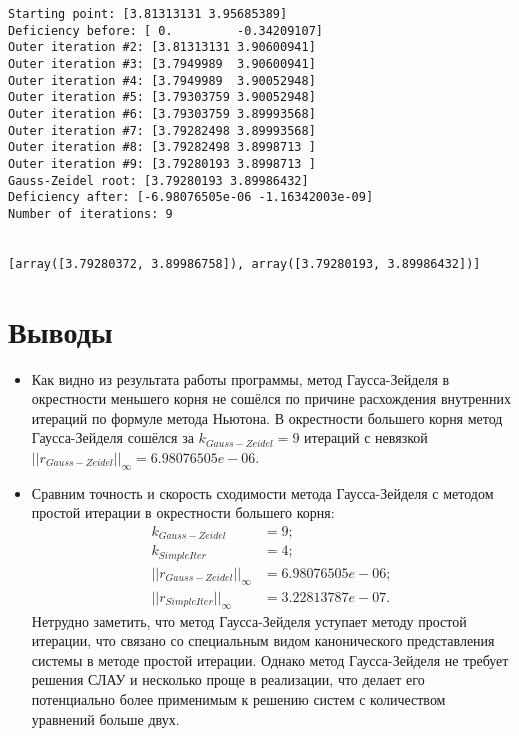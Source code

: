 \documentclass[14pt, a4paper]{article}
\begin{document}
\begin{verbatim}
Starting point: [3.81313131 3.95685389]
Deficiency before: [ 0.         -0.34209107]
Outer iteration #2: [3.81313131 3.90600941]
Outer iteration #3: [3.7949989  3.90600941]
Outer iteration #4: [3.7949989  3.90052948]
Outer iteration #5: [3.79303759 3.90052948]
Outer iteration #6: [3.79303759 3.89993568]
Outer iteration #7: [3.79282498 3.89993568]
Outer iteration #8: [3.79282498 3.8998713 ]
Outer iteration #9: [3.79280193 3.8998713 ]
Gauss-Zeidel root: [3.79280193 3.89986432]
Deficiency after: [-6.98076505e-06 -1.16342003e-09]
Number of iterations: 9


[array([3.79280372, 3.89986758]), array([3.79280193, 3.89986432])]
\end{verbatim}

  \section{Выводы}
  \begin{itemize}
  \item
  Как видно из результата работы программы, метод Гаусса-Зейделя в окрестности меньшего корня не сошёлся по причине расхождения внутренних итераций по формуле метода Ньютона. В окрестности большего корня метод Гаусса-Зейделя сошёлся за $k_{Gauss-Zeidel} = 9$ итераций с невязкой $||r_{Gauss-Zeidel}||_{\infty} = 6.98076505e-06$.
  \item
  Сравним точность и скорость сходимости метода Гаусса-Зейделя с методом простой итерации в окрестности большего корня:
  \begin{align*}
  k_{Gauss-Zeidel} &= 9; \\
  k_{SimpleIter} &= 4; \\
  ||r_{Gauss-Zeidel}||_{\infty} &= 6.98076505e-06; \\
  ||r_{SimpleIter}||_{\infty} &= 3.22813787e-07.
  \end{align*}
  Нетрудно заметить, что метод Гаусса-Зейделя уступает методу простой итерации, что связано со специальным видом канонического представления системы в методе простой итерации.
  Однако метод Гаусса-Зейделя не требует решения СЛАУ и несколько проще в реализации, что делает его потенциально более применимым к решению систем с количеством уравнений больше двух.
  \end{itemize}
\end{document}
